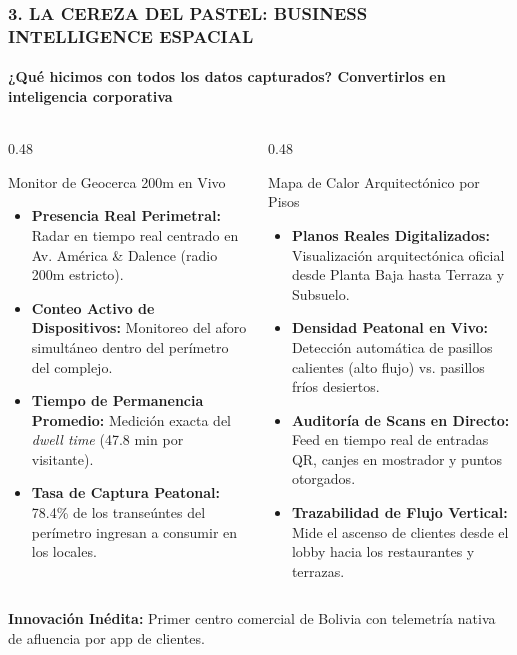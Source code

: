 \documentclass[aspectratio=169, 10pt]{beamer}
\begin{document}
\begin{frame}
  \frametitle{3. LA CEREZA DEL PASTEL: BUSINESS INTELLIGENCE ESPACIAL}
  \framesubtitle{¿Qué hicimos con todos los datos capturados? Convertirlos en inteligencia corporativa}

  \begin{columns}[T]
    \begin{column}{0.48\textwidth}
      \begin{block}{Monitor de Geocerca 200m en Vivo}
        \scriptsize
        \begin{itemize}\setlength\itemsep{0.25em}
          \item \textbf{Presencia Real Perimetral:} Radar en tiempo real centrado en Av. América \& Dalence (radio 200m estricto).
          \item \textbf{Conteo Activo de Dispositivos:} Monitoreo del aforo simultáneo dentro del perímetro del complejo.
          \item \textbf{Tiempo de Permanencia Promedio:} Medición exacta del \textit{dwell time} (47.8 min por visitante).
          \item \textbf{Tasa de Captura Peatonal:} 78.4\% de los transeúntes del perímetro ingresan a consumir en los locales.
        \end{itemize}
      \end{block}
    \end{column}

    \begin{column}{0.48\textwidth}
      \begin{exampleblock}{Mapa de Calor Arquitectónico por Pisos}
        \scriptsize
        \begin{itemize}\setlength\itemsep{0.25em}
          \item \textbf{Planos Reales Digitalizados:} Visualización arquitectónica oficial desde Planta Baja hasta Terraza y Subsuelo.
          \item \textbf{Densidad Peatonal en Vivo:} Detección automática de pasillos calientes (alto flujo) vs. pasillos fríos desiertos.
          \item \textbf{Auditoría de Scans en Directo:} Feed en tiempo real de entradas QR, canjes en mostrador y puntos otorgados.
          \item \textbf{Trazabilidad de Flujo Vertical:} Mide el ascenso de clientes desde el lobby hacia los restaurantes y terrazas.
        \end{itemize}
      \end{exampleblock}
    \end{column}
  \end{columns}

  \vskip 0.15cm
  \centering
  \color{AranjuezOrange}\scriptsize \textbf{Innovación Inédita:} Primer centro comercial de Bolivia con telemetría nativa de afluencia por app de clientes.
\end{frame}
\end{document}
